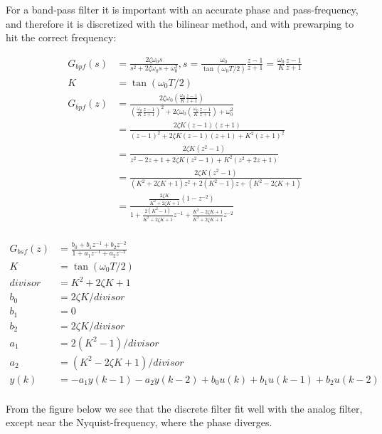 \documentclass[]{book}
\begin{document}
For a band-pass filter it is important with an accurate phase and pass-frequency, and therefore it is discretized with the bilinear method, and with prewarping to hit the correct frequency:

\[
\begin{aligned}
G_{bpf}(s) &=  \frac{2\zeta \omega_0 s}{s^2 + 2\zeta \omega_0 s + \omega_0^2}, s=\frac{\omega_0}{\tan(\omega_0 T/2)} \frac{z-1}{z+1} =\frac{\omega_0}{K} \frac{z-1}{z+1} \\
K &= \tan(\omega_0 T/2) \\
G_{bpf}(z) &=  \frac{2\zeta \omega_0 (\frac{\omega_0}{K} \frac{z-1}{z+1})}{(\frac{\omega_0}{K} \frac{z-1}{z+1})^2 + 2\zeta \omega_0 (\frac{\omega_0}{K} \frac{z-1}{z+1}) + \omega_0^2} \\
&=  \frac{2\zeta K  (z-1)(z+1)}{ (z-1)^2 + 2\zeta K (z-1)(z+1) + K^2(z+1)^2} \\
&=  \frac{2\zeta K  (z^2-1)}{ z^2-2z+1 + 2\zeta K (z^2-1) + K^2(z^2+2z+1)} \\
&=  \frac{2\zeta K  (z^2-1)}{ (K^2+2\zeta K+1)z^2 +  2(K^2-1)z + (K^2-2\zeta K+1)  } \\
&=  \frac{ \frac{2\zeta K}{K^2+2\zeta K+1}  (1-z^{-2})}{ 1 +  \frac{2(K^2-1)}{K^2+2\zeta K+1}z^{-1} + \frac{K^2-2\zeta K+1}{K^2+2\zeta K+1}z^{-2}  } \\
\end{aligned}
\label{eq:dbpf1}
\]

\[
\begin{aligned}
G_{bsf}(z) &= \frac{b_0+b_1z^{-1}+b_2z^{-2}}{1+a_1z^{-1}+a_2z^{-2}} \\
K &= \tan(\omega_0 T/2) \\
divisor &= K^2+2\zeta K+1\\
b_0 &=  2\zeta K/divisor\\
b_1 &=  0\\
b_2 &=  2\zeta K/divisor\\
a_1 &=  2(K^2-1)/divisor\\
a_2 &=  (K^2-2\zeta K+1)/divisor\\
y(k) &= -a_1y(k-1) -a_2 y(k-2) + b_0u(k)+ b_1u(k-1)+ b_2u(k-2) \\
\end{aligned}
\label{eq:dbpf2}
\]

From the figure below we see that the discrete filter fit well with the analog filter, except near the Nyquist-frequency, where the phase diverges.
\end{document}
